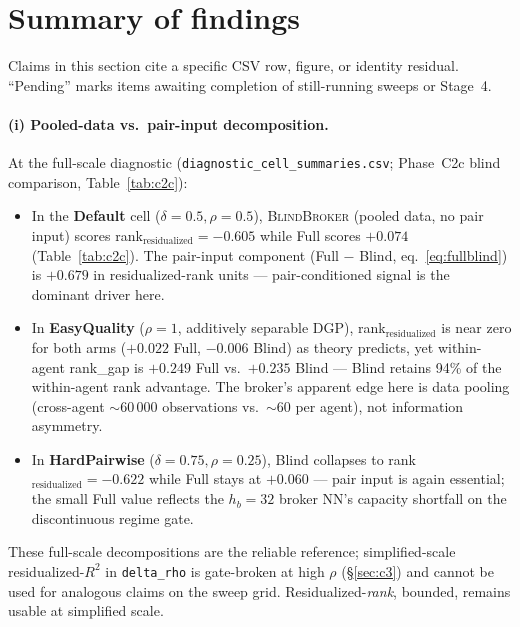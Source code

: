 \documentclass[11pt,a4paper]{article}
\begin{document}
\section{Summary of findings}
\label{sec:summary}

Claims in this section cite a specific CSV row, figure, or identity residual. ``Pending'' marks items awaiting completion of still-running sweeps or Stage~4.

\paragraph{(i) Pooled-data vs.\ pair-input decomposition.} At the full-scale diagnostic (\texttt{diagnostic\_cell\_summaries.csv}; Phase~C2c blind comparison, Table~\ref{tab:c2c}):
\begin{itemize}[leftmargin=1.5em]
\item In the \textbf{Default} cell ($\delta{=}0.5,\rho{=}0.5$), \textsc{BlindBroker} (pooled data, no pair input) scores rank$_{\text{residualized}}{=}-0.605$ while Full scores $+0.074$ (Table~\ref{tab:c2c}). The pair-input component (Full $-$ Blind, eq.~\eqref{eq:fullblind}) is $+0.679$ in residualized-rank units --- pair-conditioned signal is the dominant driver here.
\item In \textbf{EasyQuality} ($\rho{=}1$, additively separable DGP), rank$_{\text{residualized}}$ is near zero for both arms ($+0.022$ Full, $-0.006$ Blind) as theory predicts, yet within-agent rank\_gap is $+0.249$ Full vs.\ $+0.235$ Blind --- Blind retains 94\% of the within-agent rank advantage. The broker's apparent edge here is data pooling (cross-agent $\sim$60\,000 observations vs.\ $\sim$60 per agent), not information asymmetry.
\item In \textbf{HardPairwise} ($\delta{=}0.75,\rho{=}0.25$), Blind collapses to rank$_{\text{residualized}}{=}-0.622$ while Full stays at $+0.060$ --- pair input is again essential; the small Full value reflects the $h_b{=}32$ broker NN's capacity shortfall on the discontinuous regime gate.
\end{itemize}
These full-scale decompositions are the reliable reference; simplified-scale residualized-$R^2$ in \texttt{delta\_rho} is gate-broken at high $\rho$ (§\ref{sec:c3}) and cannot be used for analogous claims on the sweep grid. Residualized-\emph{rank}, bounded, remains usable at simplified scale.
\end{document}
